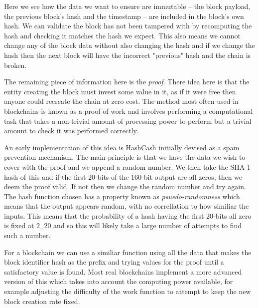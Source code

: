 Here we see how the data we want to ensure are immutable -- the block payload, the previous block's hash and the timestamp -- are included in the block's own hash.  We can validate the block has not been tampered with by recomputing the hash and checking it matches the hash we expect. This also means we cannot change any of the block data without also changing the hash and if we change the hash then the next block will have the incorrect "previous" hash and the chain is broken.

The remaining piece of information here is the \emph{proof}. There idea here is that the entity creating the block must invest some value in it, as if it were free then anyone could recreate the chain at zero cost. The method most often used in blockchains is known as a proof of work and involves performing a computational task that takes a non-trivial amount of processing power to perform but a trivial amount to check it was performed correctly.

An early implementation of this idea is HashCash  initially devised as a spam prevention mechanism. The main principle is that we have the data we wish to cover with the proof and we append a random number. We then take the SHA-1 hash of this and if the first 20-bits of the 160-bit output are all zeros, then we deem the proof valid. If not then we change the random number and try again. The hash function chosen has a property known as \emph{psuedo-randomness} which means that the output appears random, with no correllation to how similiar the inputs. This means that the probability of a hash having the first 20-bits all zero is fixed at $2_-20$ and so this will likely take a large number of attempts to find such a number.

For a blockchain we can use a similiar function using all the data that makes the block identifier hash as the prefix and trying values for the proof until a satisfactory value is found. Most real blockchains implement a more advanced version of this which takes into account the computing power available, for example adjusting the difficulty of the work function to attempt to keep the new block creation rate fixed.


